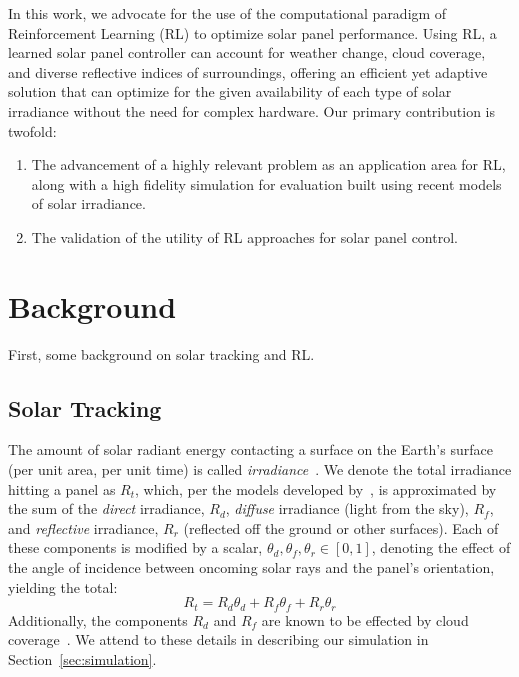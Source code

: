 \documentclass{article}
\begin{document}
In this work, we advocate for the use of the computational paradigm of Reinforcement Learning (RL) to optimize solar panel performance. Using RL, a learned solar panel controller can account for weather change, cloud coverage, and diverse reflective indices of surroundings, offering an efficient yet adaptive solution that can optimize for the given availability of each type of solar irradiance without the need for complex hardware. Our primary contribution is twofold:
\begin{enumerate}
\item The advancement of a highly relevant problem as an application area for RL, along with a high fidelity simulation for evaluation built using recent models of solar irradiance.
\item The validation of the utility of RL approaches for solar panel control.
\end{enumerate}

\section{Background}

First, some background on solar tracking and RL.

\subsection{Solar Tracking}
The amount of solar radiant energy contacting a surface on the Earth's surface (per unit area, per unit time) is called {\it irradiance}~\cite{goswami2000principles}.  We denote the total irradiance hitting a panel as $R_t$, which, per the models developed by~\citet{kamali2006estimating}, is approximated by the sum of the {\it direct} irradiance, $R_d$, {\it diffuse} irradiance (light from the sky), $R_f$, and {\it reflective} irradiance, $R_r$ (reflected off the ground or other surfaces). Each of these components is modified by a scalar, $\theta_d, \theta_f, \theta_r \in [0,1]$, denoting the effect of the angle of incidence between oncoming solar rays and the panel's orientation, yielding the total:
\begin{equation}
R_t = R_d \theta_d + R_f \theta_f + R_r \theta_r
\label{eq:total_rads}
\end{equation}
Additionally, the components $R_d$ and $R_f$ are known to be effected by cloud coverage~\cite{li2004overcast,pfister2003cloud,tzoumanikas2016effect}. We attend to these details in describing our simulation in Section~\ref{sec:simulation}.
\end{document}

